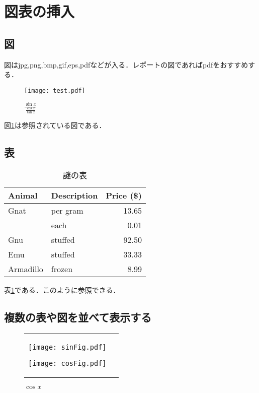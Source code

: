 \documentclass[a4j,titlepage,dvipdfmx]{jsarticle}   %
\begin{document}
  \section{図表の挿入}
  \subsection{図}
  図はjpg,png,bmp,gif,eps,pdfなどが入る．レポートの図であればpdfをおすすめする．
  \begin{figure}[H]
    \centering
    \texttt{[image: test.pdf]}
    \caption{$\frac{\sin{x}}{\frac{\cos{x}}{\tan{x}}}$}
    \label{fig:tri}
  \end{figure}
  図\ref{fig:tri}は参照されている図である．

  \subsection{表}
  \begin{table}[H]
    \centering
    \caption{謎の表}
    \label{tab:testTab}
    \begin{tabular}{|l|l|r|}
      \hline
      Animal      & Description  & Price (\$) \\ \hline
      Gnat        & per gram     & 13.65      \\ \hline
                  & each         & 0.01       \\ \hline
      Gnu         & stuffed      & 92.50      \\ \hline
      Emu         & stuffed      & 33.33      \\ \hline
      Armadillo   & frozen       & 8.99       \\ \hline
    \end{tabular}
  \end{table}
  表\ref{tab:testTab}である．このように参照できる．

  \subsection{複数の表や図を並べて表示する}
  \begin{figure}[H]
    \begin{tabular}{cc}
      \begin{minipage}{0.5\hsize}
        \centering
        \texttt{[image: sinFig.pdf]}
        \caption{$\sin{x}$}
        \label{fig:sin}
      \end{minipage}
      \begin{minipage}{0.5\hsize}
        \centering
        \texttt{[image: cosFig.pdf]}
        \caption{$\cos{x}$}
        \label{fig:cos}
      \end{minipage}
    \end{tabular}
  \end{figure}
\end{document}

